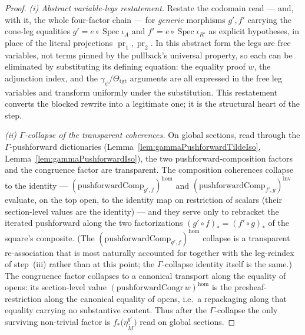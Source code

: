 \begin{proof}
  \emph{(i) Abstract variable-legs restatement.} Restate the codomain read — and, with it, the
  whole four-factor chain — for \emph{generic} morphisms \(g', f'\) carrying the cone-leg
  equalities \(g' = e \circ \operatorname{Spec}\iota_A\) and
  \(f' = e \circ \operatorname{Spec}\iota_{R'}\) as explicit hypotheses, in place of the literal
  projections \(\operatorname{pr}_1, \operatorname{pr}_2\). In this abstract form the legs are
  free variables, not terms pinned by the pullback's universal property, so each can be
  eliminated by substituting its defining equation: the equality proof \(w\), the adjunction
  index, and the \(\gamma_{\psi}\)/\(\Theta_{\mathrm{tgt}}\) arguments are all expressed in the
  free leg variables and transform uniformly under the substitution. This restatement converts
  the blocked rewrite into a legitimate one; it is the structural heart of the step.

  \emph{(ii) \(\Gamma\)-collapse of the transparent coherences.} On global sections, read through
  the \(\Gamma\)-pushforward dictionaries (Lemma~\ref{lem:gammaPushforwardTildeIso},
  Lemma~\ref{lem:gammaPushforwardIso}), the two pushforward-composition factors and the
  congruence factor are transparent. The composition coherences collapse to the identity —
  \((\mathrm{pushforwardComp}_{g',f})^{\mathrm{hom}}\) and
  \((\mathrm{pushforwardComp}_{f',g})^{\mathrm{inv}}\) evaluate, on the top open, to the identity
  map on restriction of scalars (their section-level values are the identity) — and they
  serve only to rebracket the iterated pushforward along the two factorizations
  \((g' \circ f)_* = (f' \circ g)_*\) of the square's composite. (The
  \((\mathrm{pushforwardComp}_{g',f})^{\mathrm{hom}}\) collapse is a transparent re-association
  that is most naturally accounted for together with the leg-reindex of step~(iii) rather than at
  this point; the \(\Gamma\)-collapse identity itself is the same.) The congruence factor collapses
  to a canonical transport along the equality of opens: its section-level value
  \((\mathrm{pushforwardCongr}\,w)^{\mathrm{hom}}\) is the
  presheaf-restriction along the canonical equality of opens, i.e.\ a repackaging along
  that equality carrying no substantive content. Thus after the \(\Gamma\)-collapse the only
  surviving non-trivial factor is \(f_{*}\bigl(\eta^{g'}_{\widetilde M}\bigr)\) read on global
  sections.


\end{proof}
